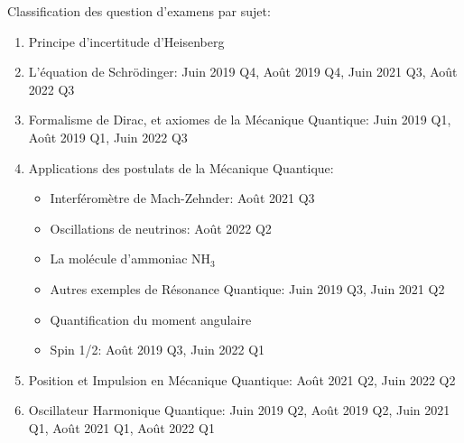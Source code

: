 \documentclass[a4paper,10pt]{book}
\begin{document}
Classification des question d'examens par sujet:

\begin{enumerate}
    \item Principe d'incertitude d'Heisenberg
    \item L'équation de Schrödinger: Juin 2019 Q4, Août 2019 Q4, Juin 2021 Q3, Août 2022 Q3
    \item Formalisme de Dirac, et axiomes de la Mécanique Quantique: Juin 2019 Q1, Août 2019 Q1, Juin 2022 Q3
    \item Applications des postulats de la Mécanique Quantique: 
    \begin{itemize}[label=\textbullet]
        \item Interféromètre de Mach-Zehnder: Août 2021 Q3
        \item Oscillations de neutrinos: Août 2022 Q2
        \item La molécule d'ammoniac $\text{NH}_3$
        \item Autres exemples de Résonance Quantique: Juin 2019 Q3, Juin 2021 Q2
        \item Quantification du moment angulaire
        \item Spin 1/2: Août 2019 Q3, Juin 2022 Q1
    \end{itemize}
    \item Position et Impulsion en Mécanique Quantique: Août 2021 Q2, Juin 2022 Q2
    \item Oscillateur Harmonique Quantique: Juin 2019 Q2, Août 2019 Q2, Juin 2021 Q1, Août 2021 Q1, Août 2022 Q1
\end{enumerate}












\end{document}
